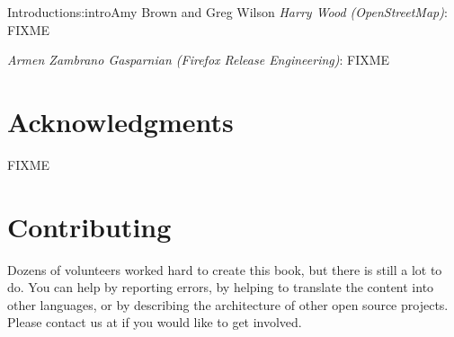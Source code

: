 \begin{aosachapter}{Introduction}{s:intro}{Amy Brown and Greg Wilson}
\emph{Harry Wood (OpenStreetMap)}: FIXME

\emph{Armen Zambrano Gasparnian (Firefox Release Engineering)}: FIXME

\section*{Acknowledgments}

FIXME

\section*{Contributing}

Dozens of volunteers worked hard to create this book, but there is
still a lot to do.  You can help by reporting errors, by helping to
translate the content into other languages, or by describing the
architecture of other open source projects.  Please contact us at
 if you would like to get involved.

\end{aosachapter}
